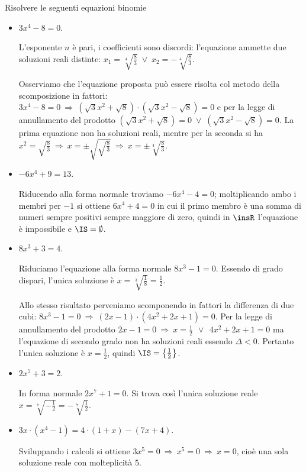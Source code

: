\begin{exrig}
 \begin{esempio}
Risolvere le seguenti equazioni binomie
\begin{itemize}
\item $3x^4-8=0$.

L'esponente $n$ è pari, i coefficienti sono discordi: l'equazione ammette due soluzioni reali distinte: $x_1=\sqrt[4]{\frac 8 3}\;\vee\; x_2=-\sqrt[4]{\frac 8 3}$.

Osserviamo che l'equazione proposta può essere risolta col metodo della scomposizione in fattori: $3x^4-8=0 \:\Rightarrow\: \left(\sqrt 3x^2+\sqrt 8\right)\cdot \left(\sqrt 3x^2-\sqrt 8\right)=0$ e per la legge di annullamento del prodotto $\left(\sqrt 3x^2+\sqrt 8\right)=0\;\vee\; \left(\sqrt 3x^2-\sqrt 8\right)=0$. La prima equazione non ha soluzioni reali, mentre per la seconda si ha $x^2=\sqrt{\frac 8 3}\:\Rightarrow\: x=\pm \sqrt{\sqrt{\frac 8 3}}\:\Rightarrow\: x=\pm \sqrt[4]{\frac 8 3}$.

\item $-6x^4+9=13$.

Riducendo alla forma normale troviamo $-6x^4-4=0$; moltiplicando ambo i membri per $-1$ si ottiene $6x^4+4=0$ in cui il primo membro è una somma di numeri sempre positivi sempre maggiore di zero, quindi in $\insR$ l'equazione è impossibile e $\IS=\emptyset $.

\item $8x^3+3=4$.

Riduciamo l'equazione alla forma normale $8x^3-1=0$. Essendo di grado dispari, l'unica soluzione è $x=\sqrt[3]{\frac 1 8}=\frac 1 2$.

Allo stesso risultato perveniamo scomponendo in fattori la differenza di due cubi: $8x^3-1=0 \:\Rightarrow\: (2x-1)\cdot \left(4x^2+2x+1\right)=0$. Per la legge di annullamento del prodotto $2x-1=0 \:\Rightarrow\: x=\frac 1 2\ \:\vee\: \ 4x^2+2x+1=0$ ma l'equazione di secondo grado non ha soluzioni reali essendo $\Delta <0$. Pertanto l'unica soluzione è $x=\frac 1 2$, quindi $\IS=\left\{\frac 1 2\right\}$.

\item $ 2x^7+3=2 $.

In forma normale $2x^7+1=0$. Si trova così l'unica soluzione reale $x=\sqrt[7]{-\frac 1 2}=-\sqrt[7]{\frac 1 2}$.

\item $3x\cdot \left(x^4-1\right)=4\cdot (1+x)-(7x+4)$.

Sviluppando i calcoli si ottiene $3x^5=0 \:\Rightarrow\: x^5=0 \:\Rightarrow\: x=0$, cioè una sola soluzione reale con molteplicità $5$.


\end{itemize}
\end{esempio}
\end{exrig}
